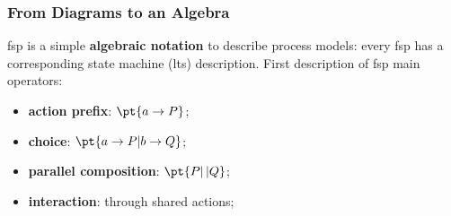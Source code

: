 \subsubsection{From Diagrams to an Algebra}\label{sub:md_from_diagrams_to_an_algebra} %
\ac{fsp} is a simple \textbf{algebraic notation} to describe process models: every \ac{fsp} has a corresponding state machine (\ac{lts}) description.
\emptyln{}
First description of \ac{fsp} main operators:
\begin{itemize}
    \item \textbf{action prefix}: $\pt{a \to P}$;
    \item \textbf{choice}: $\pt{a\to P | b \to Q}$;
    \item \textbf{parallel composition}: $\pt{P |\,| Q}$;
    \item \textbf{interaction}: through shared actions;
\end{itemize}
%
